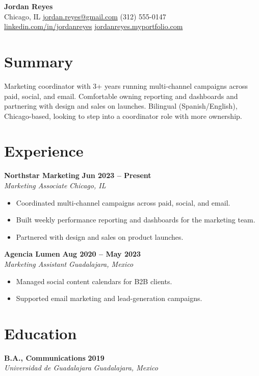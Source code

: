 \documentclass[letterpaper,11pt]{article}
\newcommand{\role}[4]{%
  \textbf{#1} \hfill \textbf{#3}\\[1pt]
  \textit{#2} \hfill \textit{#4}\\[-2pt]
}
\begin{document}
\begin{center}
  {\Huge\bfseries Jordan Reyes}\\[4pt]
  Chicago, IL \;\textbullet\;
  \href{mailto:jordan.reyes@gmail.com}{jordan.reyes@gmail.com} \;\textbullet\;
  (312) 555-0147\\[2pt]
  \href{https://linkedin.com/in/jordanreyes}{linkedin.com/in/jordanreyes} \;\textbullet\;
  \href{https://jordanreyes.myportfolio.com}{jordanreyes.myportfolio.com}
\end{center}

\section{Summary}
Marketing coordinator with 3+ years running multi-channel campaigns across paid, social,
and email. Comfortable owning reporting and dashboards and partnering with design and sales
on launches. Bilingual (Spanish/English), Chicago-based, looking to step into a coordinator
role with more ownership.

\section{Experience}

\role{Northstar Marketing}{Marketing Associate}{Jun 2023 -- Present}{Chicago, IL}
\begin{itemize}
  \item Coordinated multi-channel campaigns across paid, social, and email.
  \item Built weekly performance reporting and dashboards for the marketing team.
  \item Partnered with design and sales on product launches.
\end{itemize}

\vspace{6pt}
\role{Agencia Lumen}{Marketing Assistant}{Aug 2020 -- May 2023}{Guadalajara, Mexico}
\begin{itemize}
  \item Managed social content calendars for B2B clients.
  \item Supported email marketing and lead-generation campaigns.
\end{itemize}

\section{Education}
\textbf{B.A., Communications} \hfill \textbf{2019}\\
\textit{Universidad de Guadalajara} \hfill \textit{Guadalajara, Mexico}
\end{document}

